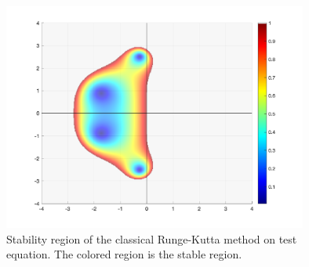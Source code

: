 \begin{figure}[H]
    \centering
    \includegraphics[width=10cm]{graphics/opg1/rk4_stability.png}
    \caption{Stability region of the classical Runge-Kutta method on test equation. The colored region is the stable region.}
    \label{fig1:rk4_stability}
\end{figure}










